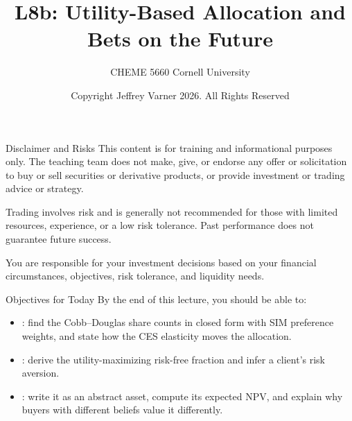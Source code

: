\documentclass[aspectratio=169,11pt]{beamer}
\title{\texorpdfstring{{\vnheavy L8b}}{L8b}: Utility-Based Allocation and Bets on the Future}
\subtitle{CHEME 5660 Cornell University}
\author{Copyright Jeffrey Varner 2026. All Rights Reserved}
\begin{document}
\vntitlepage

\begin{frame}{Disclaimer and Risks}
  \vspace{0.6em}
  \textbf{} This content is for training and informational
  purposes only. The teaching team does not make, give, or endorse any offer or
  solicitation to buy or sell securities or derivative products, or provide
  investment or trading advice or strategy.

  \vspace{1.1em}
  \textbf{} Trading involves risk and is generally not recommended for
  those with limited resources, experience, or a low risk tolerance. Past
  performance does not guarantee future success.

  \vspace{1.1em}
  \textbf{} You are responsible for your investment decisions
  based on your financial circumstances, objectives, risk tolerance, and
  liquidity needs.
\end{frame}

\begin{frame}{Objectives for Today}
By the end of this lecture, you should be able to:
\begin{itemize}\setlength{\itemsep}{0.9em}
\item {}: find the Cobb--Douglas
share counts in closed form with SIM preference weights, and state how the CES
elasticity moves the allocation.
\item {}: derive the
utility-maximizing risk-free fraction and infer a client's risk aversion.
\item {}: write it as an abstract asset,
compute its expected NPV, and explain why buyers with different beliefs value it differently.
\end{itemize}
\end{frame}
\end{document}
